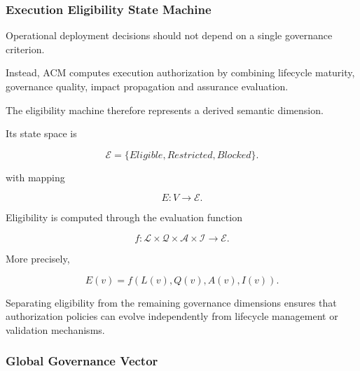 \documentclass[10pt]{article}
\begin{document}
\subsubsection{Execution Eligibility State Machine}

Operational deployment decisions should not depend on a single governance
criterion.

Instead, ACM computes execution authorization by combining lifecycle maturity,
governance quality, impact propagation and assurance evaluation.

The eligibility machine therefore represents a derived semantic dimension.

Its state space is

\begin{equation}
\mathcal{E}
=
\{
Eligible,
Restricted,
Blocked
\}.
\label{eq:eligibility_state}
\end{equation}

with mapping

\begin{equation}
E
:
V
\rightarrow
\mathcal{E}.
\label{eq:eligibility_state_mapping}
\end{equation}

Eligibility is computed through the evaluation function

\begin{equation}
f
:
\mathcal{L}
\times
\mathcal{Q}
\times
\mathcal{A}
\times
\mathcal{I}
\rightarrow
\mathcal{E}.
\label{eq:eligibility_function}
\end{equation}

More precisely,

\begin{equation}
E(v)
=
f
(
L(v),
Q(v),
A(v),
I(v)
).
\label{eq:eligibility_function_dependancy}
\end{equation}




Separating eligibility from the remaining governance dimensions ensures that
authorization policies can evolve independently from lifecycle management or
validation mechanisms.



\subsubsection{Global Governance Vector}
\end{document}
